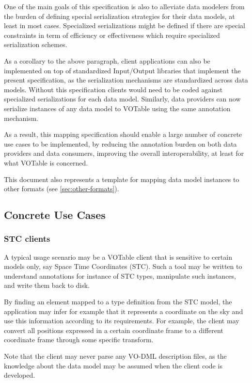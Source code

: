 \documentclass[11pt,a4paper]{ivoa}
\begin{document}
One of the main goals of this specification is also to alleviate data
modelers from the burden of defining special serialization strategies
for their data models, at least in most cases. Specialized
serializations might be defined if there are special constraints in term
of efficiency or effectiveness which require specialized serialization
schemes.

As a corollary to the above paragraph, client applications can also be
implemented on top of standardized Input/Output libraries that implement
the present specification, as the serialization mechanisms are
standardized across data models. Without this specification clients
would need to be coded against specialized serializations for each data
model. Similarly, data providers can now serialize instances of any data
model to VOTable using the same annotation mechanism.

As a result, this mapping specification should enable a large number of
concrete use cases to be implemented, by reducing the annotation burden
on both data providers and data consumers, improving the overall
interoperability, at least for what VOTable is concerned.

This document also represents a template for mapping data model
instances to other formats (see \ref{sec:other-formats}).

\subsection{Concrete Use Cases}\label{concrete-use-cases}

\subsubsection{STC clients}\label{stc-clients}

A typical usage scenario may be a VOTable client that is sensitive to
certain models only, say Space Time Coordinates (STC). Such a tool may
be written to understand annotations for instance of STC types,
manipulate such instances, and write them back to disk.

By finding an element mapped to a type definition from the STC model,
the application may infer for example that it represents a coordinate on
the sky and use this information according to its requirements. For
example, the client may convert all positions expressed in a certain
coordinate frame to a different coordinate frame through some specific
transform.

Note that the client may never parse any VO-DML description files, as
the knowledge about the data model may be assumed when the client code
is developed.
\end{document}
